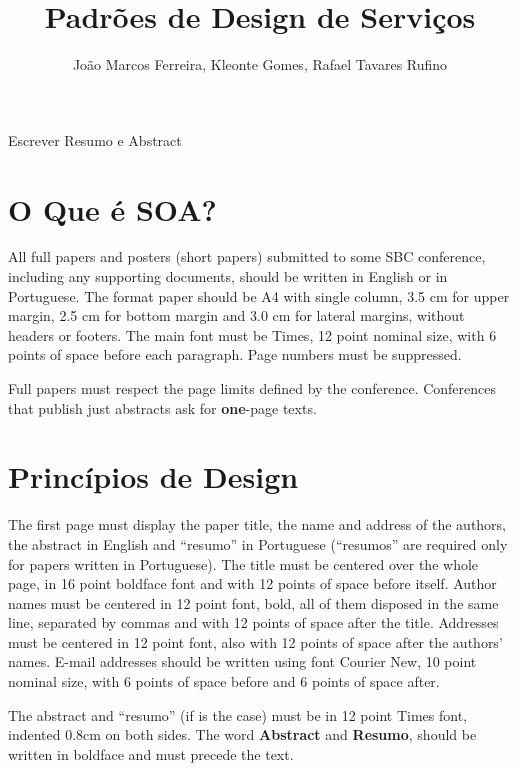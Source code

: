\documentclass[12pt]{article}
\title{Padrões de Design de Serviços}
\author{João Marcos Ferreira\inst{1}, Kleonte Gomes\inst{2}, Rafael Tavares Rufino\inst{3} }
\begin{document}
 

\maketitle

\begin{abstract}
  
\end{abstract}
     
\begin{resumo} 
  Escrever Resumo e Abstract
\end{resumo}


\section{O Que é SOA?}

All full papers and posters (short papers) submitted to some SBC conference,
including any supporting documents, should be written in English or in
Portuguese. The format paper should be A4 with single column, 3.5 cm for upper
margin, 2.5 cm for bottom margin and 3.0 cm for lateral margins, without
headers or footers. The main font must be Times, 12 point nominal size, with 6
points of space before each paragraph. Page numbers must be suppressed.

Full papers must respect the page limits defined by the conference.
Conferences that publish just abstracts ask for \textbf{one}-page texts.

\section{Princípios de Design} \label{sec:firstpage}

The first page must display the paper title, the name and address of the
authors, the abstract in English and ``resumo'' in Portuguese (``resumos'' are
required only for papers written in Portuguese). The title must be centered
over the whole page, in 16 point boldface font and with 12 points of space
before itself. Author names must be centered in 12 point font, bold, all of
them disposed in the same line, separated by commas and with 12 points of
space after the title. Addresses must be centered in 12 point font, also with
12 points of space after the authors' names. E-mail addresses should be
written using font Courier New, 10 point nominal size, with 6 points of space
before and 6 points of space after.

The abstract and ``resumo'' (if is the case) must be in 12 point Times font,
indented 0.8cm on both sides. The word \textbf{Abstract} and \textbf{Resumo},
should be written in boldface and must precede the text.
\end{document}
